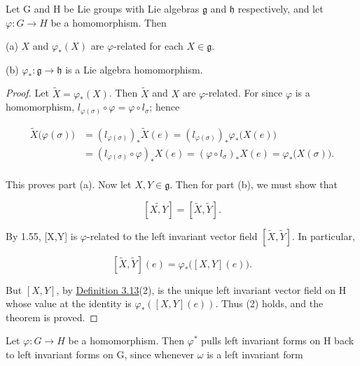 \begin{theorem}\label{thm:3.14}
Let G and H be Lie groups with Lie algebras $\mathfrak{g}$ and $\mathfrak{h}$ respectively, and let $\varphi\colon G\to H$ be a homomorphism. Then

(a) $X$ and $\varphi_{*}(X)$ are $\varphi$-related for each $X\in\mathfrak{g}$.

(b)  $ \varphi_{*}: \mathfrak{g} \to \mathfrak{h} $ is a Lie algebra homomorphism.

\end{theorem}

\begin{proof}
Let  $ \tilde{X} = \varphi_{*}(X) $. Then  $ \tilde{X} $ and  $ X $ are  $ \varphi $-related. For since  $ \varphi $ is a homomorphism,  $ l_{\varphi(\sigma)} \circ \varphi = \varphi \circ l_{\sigma} $; hence

\begin{equation}
\tag{1}\label{eq:3.14:1}
\begin{aligned}{\tilde{X}\big(\varphi(\sigma)\big)}&{{}=(l_{\varphi(\sigma)})_{*}\tilde{X}(e)=(l_{\varphi(\sigma)})_{*}\varphi_{*}\big(X(e)\big)}\\ {}&{{}=(l_{\varphi(\sigma)}\circ\varphi)_{*}X(e)=(\varphi\circ l_{\sigma})_{*}X(e)=\varphi_{*}\big(X(\sigma)\big).}\\ \end{aligned}
\end{equation}

This proves part (a). Now let $X, Y \in \mathfrak{g}$. Then for part (b), we must show that

\begin{equation}
\tag{2}\label{eq:3.14:2}
[\widetilde{X,Y}]=[\widetilde{X},\widetilde{Y}].
\end{equation}

By 1.55, [X,Y] is  $ \varphi $-related to the left invariant vector field  $ [\tilde{X},\tilde{Y}] $. In particular,

\begin{equation}
\tag{3}\label{eq:3.14:3}
[\tilde{X},\tilde{Y}](e)=\varphi_{*}\big([X,Y](e)\big).
\end{equation}

But  $ [X,Y] $, by \hyperref[thm:3.13]{Definition 3.13}(2), is the unique left invariant vector field on H whose value at the identity is  $ \varphi_{*}([X,Y](e)) $. Thus (2) holds, and the theorem is proved.

\end{proof}
\label{thm:3.15}
Let  $ \varphi: G \to H $ be a homomorphism. Then  $ \varphi^{*} $ pulls left invariant forms on H back to left invariant forms on G, since whenever  $ \omega $ is a left invariant form

